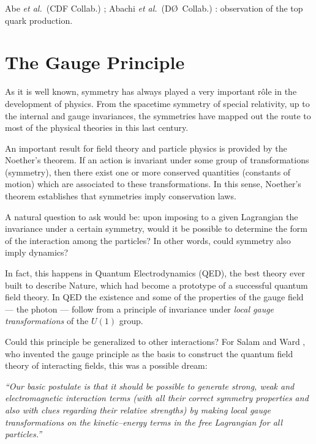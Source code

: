 \documentclass[12pt]{report}
\newcommand{\slb}[1]{\textbf{\textsl{#1}}}
\newcommand{\nin}{\noindent}
\newcommand{\et}{{\it et al.\/}}
\begin{document}
\nin
\fbox{\slb{1995}} Abe \et\ (CDF Collab.) \cite{Abe:95}; Abachi \et\
(D\O\ Collab.) \cite{Abachi:95}: observation of the top quark
production.



\newpage
\section{The Gauge Principle} 
\label{gau:pri}
\indent

As it is well known, symmetry has always played a very important
r\^ole in the development of physics. From the spacetime symmetry of
special relativity, up to the internal and gauge invariances, the
symmetries have mapped out the route to most of the physical theories
in this last century.  

An important result for field theory and particle physics is provided
by the Noether's theorem. If an action is invariant under some group
of transformations (symmetry), then there exist one or more conserved
quantities (constants of motion) which are associated to these
transformations. In this sense, Noether's theorem establishes that
symmetries imply conservation laws. 

A natural question to ask would be: upon imposing to a given
Lagrangian the invariance under a certain symmetry, would it be
possible to  determine the form of the interaction among the
particles? In other words, could symmetry also imply dynamics?

In fact, this happens in Quantum Electrodynamics (QED), the best
theory ever built to describe Nature, which had become a prototype
of a successful quantum field theory. In QED the existence and some of
the properties of the gauge field --- the photon ---  follow from a
principle of invariance under {\it local gauge transformations} of
the $U(1)$ group.

Could this principle be generalized to other interactions? For Salam
and Ward \cite{Salam:61}, who invented the gauge principle as the
basis to construct the quantum field theory of interacting fields,
this was a possible dream:

\begin{center}
\begin{minipage}[h]{12cm}
{\it ``Our basic postulate is that it should be possible to generate
strong, weak and electromagnetic interaction terms (with all their
correct symmetry properties and also with clues regarding their
relative strengths) by making local gauge transformations on the
kinetic--energy terms in the free Lagrangian for all particles.''} 
\end{minipage}
\end{center}
\end{document}
